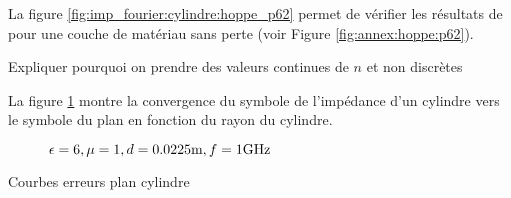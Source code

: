     La figure \ref{fig:imp_fourier:cylindre:hoppe_p62} permet de vérifier les résultats de \cite[p.~62]{hoppe_impedance_1995} pour une couche de matériau sans perte (voir Figure \ref{fig:annex:hoppe:p62}).

    \begin{TODO}
      Expliquer pourquoi on prendre des valeurs continues de \(n\) et non discrètes
    \end{TODO}


    La figure \ref{fig:imp_fourier:cylindre:hoppe_p62:converge_rayon} montre la convergence du symbole de l'impédance d'un cylindre vers le symbole du plan en fonction du rayon du cylindre.

    \begin{figure}[!hbt]
      \centering
      
      \caption{\(\epsilon = 6, \mu = 1, d=0.0225\text{m}, f=1\text{GHz}\)}
      \label{fig:imp_fourier:cylindre:hoppe_p62:converge_rayon}
    \end{figure}

\begin{TODO}
  Courbes erreurs plan cylindre
\end{TODO}

